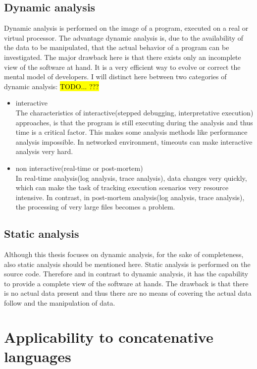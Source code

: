 \subsection{Dynamic analysis}

Dynamic analysis is performed on the image of a program, executed on a real or virtual processor. The advantage dynamic analysis is, due to the availability of the data to be manipulated, that the actual behavior of a program can be investigated. The major drawback here is that there exists only an incomplete view of the software at hand\cite{Ball:1999:CDA:318774.318944}. It is a very efficient way to evolve or correct the mental model of developers.
I will distinct here between two categories of dynamic analysis:
\hl{TODO... ???}
\begin{itemize}
\item interactive\\
	The characteristics of interactive(stepped debugging, interpretative execution) approaches, is that the program is still executing during the analysis and thus time is a critical factor. This makes some analysis methods like performance analysis impossible. In networked environment, timeouts can make interactive analysis very hard.
\item non interactive(real-time or post-mortem)\\
	In real-time analysis(log analysis, trace analysis), data changes very quickly, which can make the task of tracking execution scenarios very resource intensive. In contrast, in post-mortem analysis(log analysis, trace analysis), the processing of very large files becomes a problem.
\end{itemize}

\subsection{Static analysis}

Although this thesis focuses on dynamic analysis, for the sake of completeness, also static analysis should be mentioned here.
Static analysis is performed on the source code. Therefore and in contrast to dynamic analysis, it has the capability to provide a complete view of the software at hands. The drawback is that there is no actual data present and thus there are no means of covering the actual data follow and the manipulation of data.

\section{Applicability to concatenative languages}

